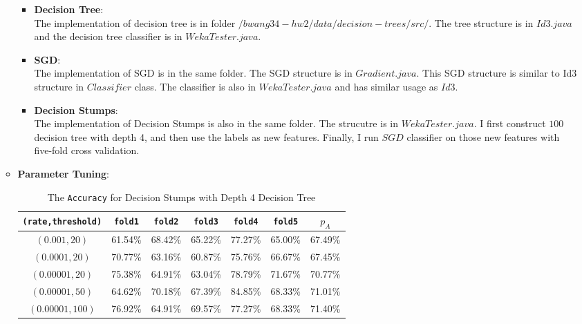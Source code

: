 \begin{enumerate}
\begin{itemize}
			\begin{itemize}
			\item \textbf{Decision Tree}:\\
			The implementation of decision tree is in folder $/bwang34-hw2/data/decision-trees/src/$. The tree structure is in $Id3.java$ and the decision tree classifier is in $WekaTester.java$. \\
			\item \textbf{SGD}:\\
			The implementation of SGD is in the same folder. The SGD structure is in $Gradient.java$. This SGD structure is similar to Id3 structure in $Classifier$ class. The classifier is also in $WekaTester.java$ and has similar usage as $Id3$. \\
			\item \textbf{Decision Stumps}:\\
			The implementation of Decision Stumps is also in the same folder. The strucutre is in $WekaTester.java$. I first construct $100$ decision tree with depth 4, and then use the labels as new features. Finally, I run $SGD$ classifier on those new features with five-fold cross validation. \\
			\end{itemize}
		\item \textbf{Parameter Tuning}:
			\begin{table}[h]
				\centering
				\begin{tabular}[h]{|c|c|c|c|c|c|c|}
					\hline
					\texttt{(rate,threshold)} & \texttt{fold1} & \texttt{fold2} & \texttt{fold3} & \texttt{fold4} & \texttt{fold5} & \texttt{$p_A$}\\
					\hline
					$(0.001, 20)$     & 61.54\%    & 68.42\%    & 65.22\%    & 77.27\%    & 65.00\%    & 67.49\% \\
					$(0.0001, 20)$    & 70.77\%    & 63.16\%    & 60.87\%    & 75.76\%    & 66.67\%    & 67.45\% \\
					$(0.00001, 20)$   & 75.38\%    & 64.91\%    & 63.04\%    & 78.79\%    & 71.67\%    & 70.77\% \\
					$(0.00001, 50)$   & 64.62\%    & 70.18\%    & 67.39\%    & 84.85\%    & 68.33\%    & 71.01\% \\
					$(0.00001, 100)$  & 76.92\%    & 64.91\%    & 69.57\%    & 77.27\%    & 68.33\%    & 71.40\% \\
					\hline
				\end{tabular}
				\caption{The {\tt Accuracy} for Decision Stumps with Depth 4 Decision Tree }
				\label{tab:Balloons}

\end{table}
\end{itemize}
\end{enumerate}
